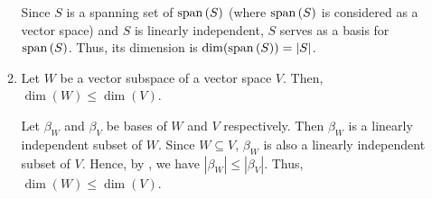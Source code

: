 \begin{enumerate}
\begin{enumerate}
\begin{pf}
Since \(S\) is a spanning set of \(\operatorname{span}\qty(S)\) (where \(\operatorname{span}\qty(S)\) is considered
as a vector space) and \(S\) is linearly independent, \(S\) serves as a basis
for \(\operatorname{span}\qty(S)\). Thus, its dimension is \(\dim(\operatorname{span}\qty(S))=|S|\).
\end{pf}
\item \label{it:dim-subspace} Let \(W\) be a vector subspace of a vector space
\(V\). Then, \(\dim(W)\le \dim(V)\).

\begin{pf}
Let \(\beta_W\) and \(\beta_V\) be bases of \(W\) and \(V\) respectively. Then
\(\beta_W\) is a linearly independent subset of \(W\). Since \(W\subseteq V\),
\(\beta_W\) is also a linearly independent subset of \(V\). Hence, by
, we have \(|\beta_W|\le |\beta_V|\). Thus,
\(\dim(W)\le \dim(V)\).
\end{pf}
\end{enumerate}
\end{enumerate}

